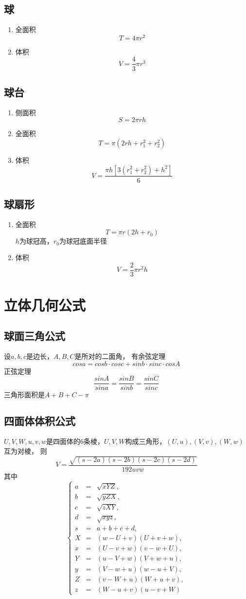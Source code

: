 	\subsection{球}
		\begin{enumerate}
			\item 全面积
				$$T=4\pi r^2$$
			\item 体积
				$$V=\frac{4}{3}\pi r^3$$
		\end{enumerate}
	\subsection{球台}
		\begin{enumerate}
			\item 侧面积
				$$S=2\pi rh$$
			\item 全面积
				$$T=\pi(2rh+r_1^2+r_2^2)$$
			\item 体积
				$$V=\frac{\pi h[3(r_1^2+r_2^2)+h^2]}{6}$$
		\end{enumerate}
	\subsection{球扇形}
		\begin{enumerate}
			\item 全面积
				$$T=\pi r(2h+r_0)$$
				$h$为球冠高，$r_0$为球冠底面半径
			\item 体积
				$$V=\frac{2}{3}\pi r^2h$$
		\end{enumerate}
\section{立体几何公式}
	\subsection{球面三角公式}
		设$a, b, c$是边长，$A, B, C$是所对的二面角，
		有余弦定理$$cos a = cos b \cdot cos c + sin b \cdot sin c \cdot cos A$$
		正弦定理$$\frac{sin A}{sin a} = \frac{sin B}{sin b} = \frac{sin C}{sin c}$$
		三角形面积是$A + B + C - \pi$
	\subsection{四面体体积公式}
		$U, V, W, u, v, w$是四面体的$6$条棱，$U, V, W$构成三角形，$(U, u), (V, v), (W, w)$互为对棱，
		则$$V = \frac{\sqrt{(s - 2a)(s - 2b)(s - 2c)(s - 2d)}}{192 uvw}$$
		其中$$\left\{\begin{array}{lll}
				a & = & \sqrt{xYZ}, \\
				b & = & \sqrt{yZX}, \\
				c & = & \sqrt{zXY}, \\
				d & = & \sqrt{xyz}, \\
				s & = & a + b + c + d, \\ 
				X & = & (w - U + v)(U + v + w), \\
				x & = & (U - v + w)(v - w + U), \\
				Y & = & (u - V + w)(V + w + u), \\
				y & = & (V - w + u)(w - u + V), \\
				Z & = & (v - W + u)(W + u + v), \\
				z & = & (W - u + v)(u - v + W)
			\end{array}\right.$$
